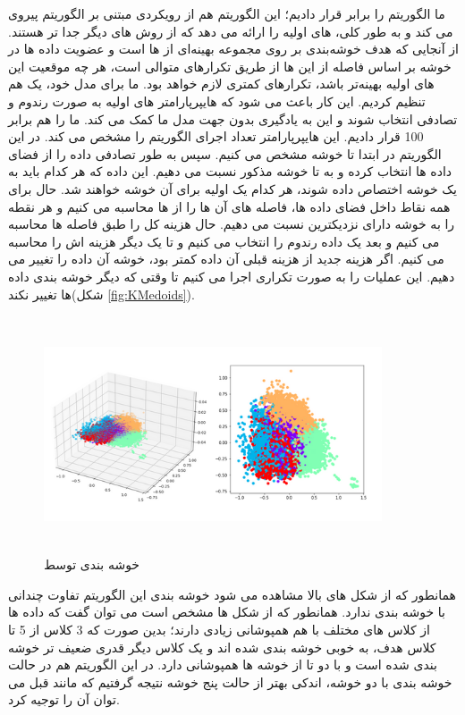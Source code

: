 \documentclass[12pt,onecolumn,a4paper]{article}
\begin{document}
ما الگوریتم  را برابر  قرار دادیم؛ این الگوریتم هم از رویکردی مبتنی بر الگوریتم  پیروی می کند و به طور کلی،  های اولیه را ارائه می دهد که از روش های دیگر جدا تر هستند. از آنجایی که هدف خوشه‌بندی  بر روی مجموعه بهینه‌ای از  ها است و عضویت داده ها در خوشه بر اساس فاصله از این  ها از طریق تکرارهای متوالی است، هر چه موقعیت‌ این  های اولیه بهینه‌تر باشد، تکرارهای کمتری لازم خواهد بود. 
ما برای مدل خود، یک  هم تنظیم کردیم. این کار باعث می شود که هایپرپارامتر های اولیه به صورت رندوم و تصادفی انتخاب شوند و این به یادگیری بدون جهت مدل ما کمک می کند.
ما  را هم برابر 100 قرار دادیم. این هایپرپارامتر تعداد اجرای الگوریتم را مشخص می کند.
در این الگوریتم در ابتدا  تا خوشه مشخص می کنیم. سپس به طور تصادفی  داده را از فضای داده ها انتخاب کرده و به  تا خوشه مذکور نسبت می دهیم. این  داده که هر کدام باید به یک خوشه اختصاص داده شوند، هر کدام یک  اولیه برای آن خوشه خواهند شد. حال برای همه نقاط داخل فضای داده ها، فاصله های آن ها را از  ها محاسبه می کنیم و هر نقطه را به خوشه دارای نزدیکترین  نسبت می دهیم. حال هزینه کل را طبق فاصله ها محاسبه می کنیم و بعد یک داده رندوم را انتخاب می کنیم و تا یک  دیگر هزینه اش را محاسبه می کنیم. اگر هزینه جدید از هزینه قبلی آن داده کمتر بود، خوشه آن داده را تغییر می دهیم. این عملیات را به صورت تکراری اجرا می کنیم تا وقتی که دیگر خوشه بندی داده ها تغییر نکند(شکل \ref{fig:KMedoids}).

\begin{figure}
  \centering
  \includegraphics[width=10cm,height=7cm,keepaspectratio]{19.png}
  \caption{خوشه بندی توسط }
  \label{fig:KMeans}
\end{figure}

همانطور که از شکل های بالا مشاهده می شود خوشه بندی این الگوریتم تفاوت چندانی با خوشه بندی  ندارد. همانطور که از شکل ها مشخص است می توان گفت که داده ها از کلاس های مختلف با هم همپوشانی زیادی دارند؛ بدین صورت که 3 کلاس از 5 تا کلاس هدف، به خوبی خوشه بندی شده اند و یک کلاس دیگر قدری ضعیف تر خوشه بندی شده است و با دو تا از خوشه ها همپوشانی دارد. در این الگوریتم هم در حالت خوشه بندی با دو خوشه، اندکی بهتر از حالت پنج خوشه نتیجه گرفتیم که مانند قبل می توان آن را توجیه کرد.
\end{document}
